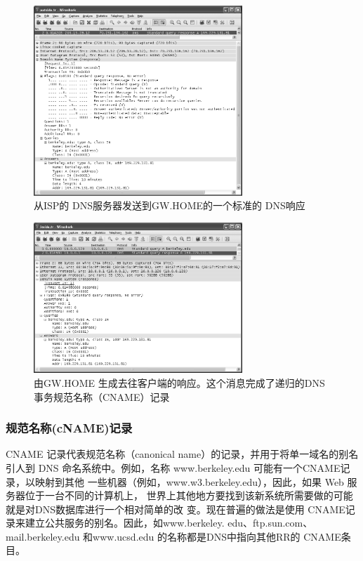 \begin{figure}[!htb]
  \centering
  \includegraphics[width=0.7\textwidth]{imgs/11/11-12.png}
  \caption{从ISP的 DNS服务器发送到GW.HOME的一个标准的 DNS响应}
\end{figure}

\begin{figure}[!htb]
  \centering
  \includegraphics[width=0.7\textwidth]{imgs/11/11-13.png}
  \caption{由GW.HOME 生成去往客户端的响应。这个消息完成了递归的DNS 事务规范名称（CNAME）记录}
\end{figure}

\subsubsection{规范名称(cNAME)记录}

CNAME 记录代表规范名称（canonical name）的记录，并用于将单一域名的别名引人到
DNS 命名系统中。例如，名称 www.berkeley.edu 可能有一个CNAME记录，以映射到其他
一些机器（例如，www.w3.berkeley.edu），因此，如果 Web 服务器位于一台不同的计算机上，
世界上其他地方要找到该新系统所需要做的可能就是对DNS数据库进行一个相对简单的改
变。现在普遍的做法是使用 CNAME记录来建立公共服务的别名。因此，如www.berkeley.
edu、ftp.sun.com、mail.berkeley.edu 和www.ucsd.edu 的名称都是DNS中指向其他RR的
CNAME条目。

